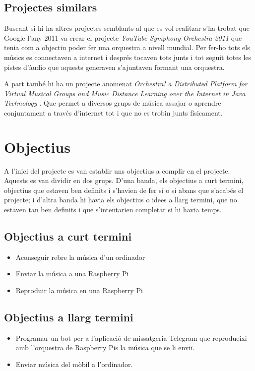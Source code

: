 \documentclass[a4paper]{paper}
\let\oldsection\section
\renewcommand\section{\clearpage\oldsection}
\begin{document}
\subsection{Projectes similars}

Buscant si hi ha altres projectes semblants al que es vol realitzar s'ha trobat que Google l'any 2011 va crear el projecte \emph{YouTube Symphony Orchestra 2011}\cite{YoutubeSymphoni} que tenia com a objectiu poder fer una orquestra a nivell mundial. Per fer-ho tots els músics es connectaven a internet i després tocaven tots junts i tot seguit totes les pistes d'àudio que aquests generaven s'ajuntaven formant una orquestra.

A part també hi ha un projecte anomenat \emph{Orchestra! a Distributed Platform for Virtual Musical Groups and Music Distance Learning over the Internet in Java \texttrademark Technology} \cite{Orchestra}. Que permet a diversos grups de música assajar o aprendre conjuntament a través d'internet tot i que no es trobin junts físicament.

\section{Objectius}
A l'inici del projecte es van establir uns objectius a complir en el projecte. Aquests es van dividir en dos grups. D'una banda, els objectius a curt termini, objectius que estaven ben definits i s'havien de fer sí o sí abans que s'acabés el projecte; i d'altra banda hi havia els objectius o idees a llarg termini, que no estaven tan ben definits i que s'intentarien completar si hi havia temps.

\subsection{Objectius a curt termini}
\begin{itemize}
	\item Aconseguir rebre la música d'un ordinador
	\item Enviar la música a una Raspberry Pi
	\item Reproduir la música en una Raspberry Pi
\end{itemize}

\subsection{Objectius a llarg termini}
\begin{itemize}
	\item Programar un bot per a l'aplicació de missatgeria Te\textit{}legram que reprodueixi amb l'orquestra de Raspberry Pis la música que se li enviï.
	\item Enviar música del mòbil a l'ordinador.
\end{itemize}
\end{document}
